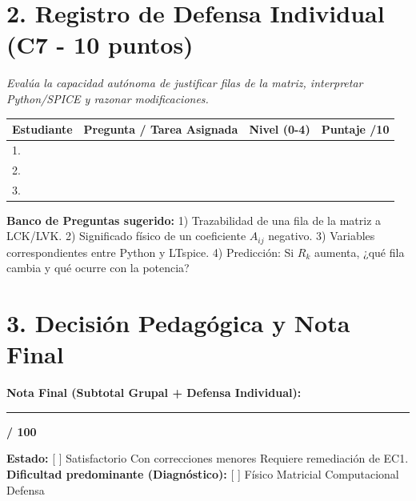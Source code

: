 \documentclass[11pt, a4paper]{article}
\begin{document}
\section*{2. Registro de Defensa Individual (C7 - 10 puntos)}
\textit{Evalúa la capacidad autónoma de justificar filas de la matriz, interpretar Python/SPICE y razonar modificaciones.}

\begin{tabularx}{\textwidth}{@{}|X|X|X|X|@{}}
    \hline
    \rowcolor{ucbblue!10}
    \textbf{Estudiante} & \textbf{Pregunta / Tarea Asignada} & \textbf{Nivel (0-4)} & \textbf{Puntaje /10} \\
    \hline
    1. & & & \\
    \hline
    2. & & & \\
    \hline
    3. & & & \\
    \hline
\end{tabularx}

\vspace{0.2cm}
\textbf{Banco de Preguntas sugerido:} 
1) Trazabilidad de una fila de la matriz a LCK/LVK. 
2) Significado físico de un coeficiente $A_{ij}$ negativo. 
3) Variables correspondientes entre Python y LTspice. 
4) Predicción: Si $R_k$ aumenta, ¿qué fila cambia y qué ocurre con la potencia?

\section*{3. Decisión Pedagógica y Nota Final}
\textbf{Nota Final (Subtotal Grupal + Defensa Individual):} \rule{3cm}{0.4pt} \textbf{/ 100}

\vspace{0.2cm}
\textbf{Estado:} [ ] Satisfactorio \quad [ ] Con correcciones menores \quad [ ] Requiere remediación de EC1. \\
\textbf{Dificultad predominante (Diagnóstico):} [ ] Físico \quad [ ] Matricial \quad [ ] Computacional \quad [ ] Defensa
\end{document}
